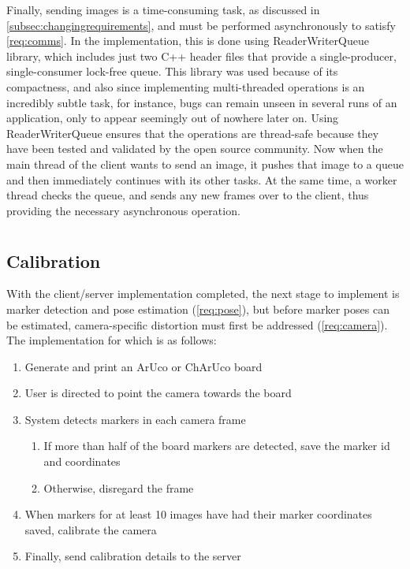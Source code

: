 Finally, sending images is a time-consuming task, as discussed in \cref{subsec:changingrequirements}, and must be performed asynchronously to satisfy \cref{req:comms}. In the implementation, this is done using  ReaderWriterQueue library, which includes just two C++ header files that provide a single-producer, single-consumer lock-free queue. This library was used because of its compactness, and also since implementing multi-threaded operations is an incredibly subtle task, for instance, bugs can remain unseen in several runs of an application, only to appear seemingly out of nowhere later on. Using ReaderWriterQueue ensures that the operations are thread-safe because they have been tested and validated by the open source community. Now when the main thread of the client wants to send an image, it pushes that image to a queue and then immediately continues with its other tasks. At the same time, a worker thread checks the queue, and sends any new frames over to the client, thus providing the necessary asynchronous operation.

\section{\detection}
\subsection{Calibration}\label{calib}

With the client/server implementation completed, the next stage to implement is marker detection and pose estimation (\cref{req:pose}), but before marker poses can be estimated, camera-specific distortion must first be addressed (\cref{req:camera}). The implementation for which is as follows:

\begin{enumerate}
	\item Generate and print an ArUco or ChArUco board
	\item User is directed to point the camera towards the board
	\item System detects markers in each camera frame
	\begin{enumerate}
		\item If more than half of the board markers are detected, save the marker id and coordinates
		\item Otherwise, disregard the frame
	\end{enumerate}
	\item When markers for at least 10 images have had their marker coordinates saved, calibrate the camera
	\item Finally, send calibration details to the server
\end{enumerate}

